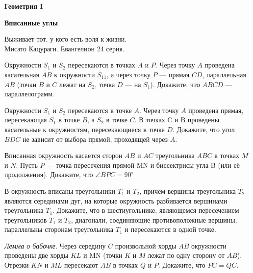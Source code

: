 \centerline{\bf \Huge Геометрия I}
\centerline{\bf \Huge Вписанные углы}

\begin{flushright}
        \scriptsize{Выживает тот, у кого есть воля к жизни.\\Мисато Кацураги. Евангелион 24 серия.}
\end{flushright}

Окружности $S_1$ и $S_2$ пересекаются в точках $A$ и $P$. Через точку $A$ проведена касательная $AB$ к окружности $S_11$, а через точку $P$ --- прямая $CD$, параллельная $AB$ (точки $B$ и $C$ лежат на $S_2$, точка $D$ --- на $S_1$). Докажите, что $ABCD$ --- параллелограмм.

Окружности $S_1$ и $S_2$ пересекаются в точке $A$. Через точку $A$ проведена прямая, пересекающая $S_1$ в точке $B$, а $S_2$ в точке $C$. В точках C и B проведены касательные к окружностям, пересекающиеся в точке $D$. Докажите, что угол $BDC$ не зависит от выбора прямой, проходящей через $A$.

Вписанная окружность касается сторон $AB$ и $AC$ треугольника $ABC$ в точках $M$ и $N$. Пусть $P$ --- точка пересечения прямой MN и биссектрисы угла B (или её продолжения). Докажите, что $\angle BPC = 90^{\circ}$

В окружность вписаны треугольники $T_1$ и $T_2$, причём вершины треугольника $T_2$ являются серединами дуг, на которые окружность разбивается вершинами треугольника $T_1$. Докажите, что в шестиугольнике, являющемся пересечением треугольников $T_1$ и $T_2$, диагонали, соединяющие противоположные вершины, параллельны сторонам треугольника $T_1$ и пересекаются в одной точке.


\textit{Лемма о бабочке.}
Через середину $C$ произвольной хорды $AB$ окружности проведены две хорды $KL$ и MN (точки $K$ и $M$ лежат по одну сторону от $AB$). Отрезки $KN$ и $ML$ пересекают $AB$ в точках $Q$ и $P$. Докажите, что $PC=QC$.